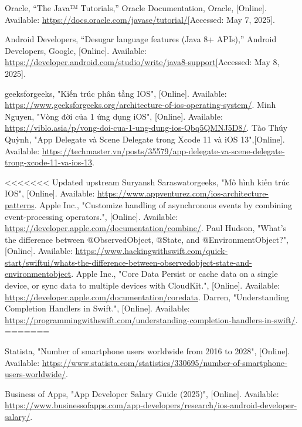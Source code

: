 \documentclass[12pt]{report}
\begin{document}
\begin{thebibliography}{1}
  Oracle, “The Java™ Tutorials,” Oracle Documentation, Oracle, [Online]. Available: \url{https://docs.oracle.com/javase/tutorial/}[Accessed: May 7, 2025].
 
  Android Developers, “Desugar language features (Java 8+ APIs),” Android Developers, Google, [Online]. Available: \url{https://developer.android.com/studio/write/java8-support}[Accessed: May 8, 2025].
 
  
 geeksforgeeks, "Kiến trúc phân tầng IOS", [Online]. Available: \url{https://www.geeksforgeeks.org/architecture-of-ios-operating-system/}.
  Minh Nguyen, "Vòng đời của 1 ứng dụng iOS", [Online]. Available: \url{https://viblo.asia/p/vong-doi-cua-1-ung-dung-ios-Qbq5QMNJ5D8/}.
Tào Thúy Quỳnh, "App Delegate và Scene Delegate trong Xcode 11 và iOS 13",[Online]. Available: \url{https://techmaster.vn/posts/35579/app-delegate-va-scene-delegate-trong-xcode-11-va-ios-13}.

<<<<<<< Updated upstream
Suryansh Saraswatorgeeks, "Mô hình kiến trúc IOS", [Online]. Available: \url{https://www.appventurez.com/ios-architecture-patterns}.
Apple Inc., "Customize handling of asynchronous events by combining event-processing operators.", [Online]. Available: \url{https://developer.apple.com/documentation/combine/}.
 Paul Hudson, "What’s the difference between @ObservedObject, @State, and @EnvironmentObject?", [Online]. Available: \url{https://www.hackingwithswift.com/quick-start/swiftui/whats-the-difference-between-observedobject-state-and-environmentobject}.
 Apple Inc., "Core Data Persist or cache data on a single device, or sync data to multiple devices with CloudKit.", [Online]. Available: \url{https://developer.apple.com/documentation/coredata}.
 Darren, "Understanding Completion Handlers in Swift.", [Online]. Available: \url{https://programmingwithswift.com/understanding-completion-handlers-in-swift/}.
=======

    Statista, "Number of smartphone users worldwide from 2016 to 2028", [Online]. Available: \url{https://www.statista.com/statistics/330695/number-of-smartphone-users-worldwide/}.
    
    Business of Apps, "App Developer Salary Guide (2025)", [Online]. Available: \url{https://www.businessofapps.com/app-developers/research/ios-android-developer-salary/}.


\end{thebibliography}
\end{document}
